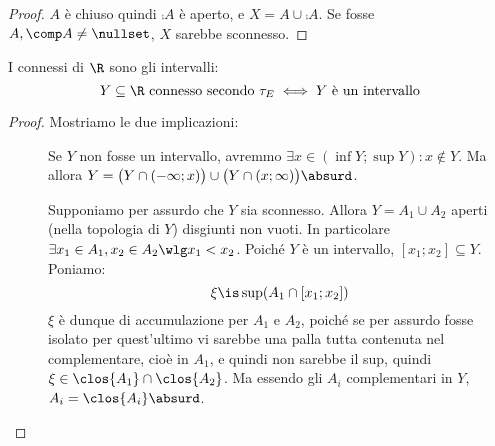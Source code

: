 \begin{proof}
	$A$ è chiuso quindi $\comp A$ è aperto,
	e $X=A\cup\comp A$.
	Se fosse $A,\comp A\neq\nullset$,
	$X$ sarebbe sconnesso.
\end{proof}

\begin{prop}
	I connessi di $\R$ sono gli intervalli:
	\[Y\subseteq\R\text{ connesso secondo }\tau_E\iff
	Y\text{ è un intervallo}\]
\end{prop}

\begin{proof}
	Mostriamo le due implicazioni:
	\begin{description}
		\item[\proofrightarrow]
			Se $Y$ non fosse un intervallo, avremmo
			$\exists x\in(\inf Y;\sup Y):x\not\in Y$.
			Ma allora $Y=\big(Y\cap(-\infty;x)\big)\cup\big(Y\cap(x;\infty)\big)\absurd$.
		\item[\proofleftarrow]
			Supponiamo per assurdo che $Y$ sia sconnesso.
			Allora $Y=A_1\cup A_2$ aperti (nella topologia di $Y$) disgiunti non vuoti.
			In particolare $\exists x_1\in A_1,x_2\in A_2\wlg x_1<x_2$.
			Poiché $Y$ è un intervallo, $[x_1;x_2]\subseteq Y$.
			Poniamo:
			\[\xi\is\sup(A_1\cap[x_1;x_2])\]
			$\xi$ è dunque di accumulazione per $A_1$ e $A_2$, poiché se per assurdo fosse isolato per quest'ultimo vi sarebbe una palla tutta contenuta nel complementare, cioè in $A_1$, e quindi non sarebbe il sup, quindi
			$\xi\in\clos{A_1}\cap\clos{A_2}$.
			Ma essendo gli $A_i$ complementari in $Y$, $A_i=\clos{A_i}\absurd$.
			\qedhere
	\end{description}
\end{proof}
